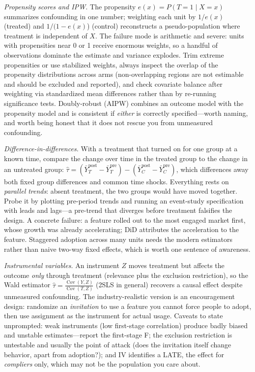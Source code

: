 \emph{Propensity scores and IPW.} The propensity $e(x) = P(T=1 \mid X=x)$ summarizes confounding in one number; weighting each unit by $1/e(x)$ (treated) and $1/(1-e(x)$) (control) reconstructs a pseudo-population where treatment is independent of $X$. The failure mode is arithmetic and severe: units with propensities near 0 or 1 receive enormous weights, so a handful of observations dominate the estimate and variance explodes. Trim extreme propensities or use stabilized weights, always inspect the overlap of the propensity distributions across arms (non-overlapping regions are not estimable and should be excluded and reported), and check covariate balance after weighting via standardized mean differences rather than by re-running significance tests. Doubly-robust (AIPW) combines an outcome model with the propensity model and is consistent if \emph{either} is correctly specified---worth naming, and worth being honest that it does not rescue you from unmeasured confounding.

\emph{Difference-in-differences.} With a treatment that turned on for one group at a known time, compare the change over time in the treated group to the change in an untreated group: $\hat\tau = (\bar Y^{\text{post}}_{T} - \bar Y^{\text{pre}}_{T}) - (\bar Y^{\text{post}}_{C} - \bar Y^{\text{pre}}_{C})$, which differences away both fixed group differences and common time shocks. Everything rests on \emph{parallel trends}: absent treatment, the two groups would have moved together. Probe it by plotting pre-period trends and running an event-study specification with leads and lags---a pre-trend that diverges before treatment falsifies the design. A concrete failure: a feature rolled out to the most engaged market first, whose growth was already accelerating; DiD attributes the acceleration to the feature. Staggered adoption across many units needs the modern estimators rather than naive two-way fixed effects, which is worth one sentence of awareness.

\emph{Instrumental variables.} An instrument $Z$ moves treatment but affects the outcome \emph{only} through treatment (relevance plus the exclusion restriction), so the Wald estimator $\hat\tau = \frac{\operatorname{Cov}(Y,Z)}{\operatorname{Cov}(T,Z)}$ (2SLS in general) recovers a causal effect despite unmeasured confounding. The industry-realistic version is an encouragement design: randomize an \emph{invitation} to use a feature you cannot force people to adopt, then use assignment as the instrument for actual usage. Caveats to state unprompted: weak instruments (low first-stage correlation) produce badly biased and unstable estimates---report the first-stage F; the exclusion restriction is untestable and usually the point of attack (does the invitation itself change behavior, apart from adoption?); and IV identifies a LATE, the effect for \emph{compliers} only, which may not be the population you care about.

